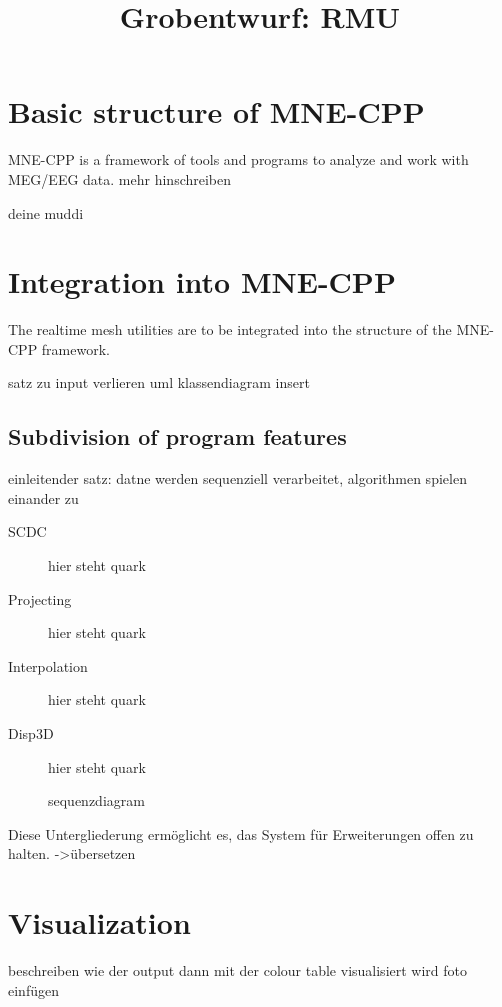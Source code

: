 \documentclass[a4paper, 11pt, ngerman, fleqn]{article}
\begin{document}
	
\title{Grobentwurf: RMU}
\vspace{3 in}
\maketitle
\clearpage

\tableofcontents

\clearpage
\section{Basic structure of MNE-CPP}

MNE-CPP is a framework of tools and programs to analyze and work with MEG/EEG data.
mehr hinschreiben 

\begin{description}
	\item[deine muddi]

\end{description}

\clearpage

\section{Integration into MNE-CPP}

The realtime mesh utilities are to be integrated into the structure of the MNE-CPP framework.


satz zu input verlieren
uml klassendiagram insert

\subsection{Subdivision of program features}

einleitender satz: datne werden sequenziell verarbeitet, algorithmen spielen einander zu

\begin{description}
	
	\item[SCDC] 
	hier steht quark
	
	\item[Projecting]
	hier steht quark
	
	\item[Interpolation]
	hier steht quark
	
	\item[Disp3D]
	hier steht quark
	

sequenzdiagram
	
\end{description}

Diese Untergliederung ermöglicht es, das System für Erweiterungen offen zu halten. ->übersetzen


\clearpage


\section{Visualization}
beschreiben wie der output dann mit der colour table visualisiert wird
foto einfügen



\clearpage
  
\end{document}
